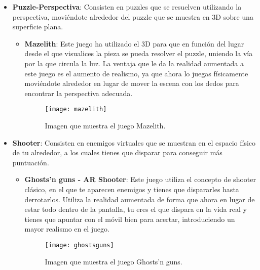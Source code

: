 \begin{itemize}
  \item \textbf{Puzzle-Perspectiva}: Consisten en puzzles que se resuelven utilizando la perspectiva, moviéndote alrededor del puzzle que se muestra en 3D sobre una superficie plana.
  \begin{itemize}
    \item \textbf{Mazelith}: Este juego ha utilizado el 3D para que en función del lugar desde el que visualices la pieza se pueda resolver el puzzle, uniendo la vía por la que circula la luz. La ventaja que le da la realidad aumentada a este juego es el aumento de realismo, ya que ahora lo juegas físicamente moviéndote alrededor en lugar de mover la escena con los dedos para encontrar la perspectiva adecuada.

    \begin{figure}[h]
      \centering
      \texttt{[image: mazelith]}
      \caption{Imagen que muestra el juego Mazelith.\protect\footnotemark}
      \label{figura-mazelith}
    \end{figure}

  \end{itemize}

\newpage

  \item \textbf{Shooter}: Consisten en enemigos virtuales que se muestran en el espacio físico de tu alrededor, a los cuales tienes que disparar para conseguir más puntuación.

  \begin{itemize}
    \item \textbf{Ghosts’n guns - AR Shooter}: Este juego utiliza el concepto de shooter clásico, en el que te aparecen enemigos y tienes que dispararles hasta derrotarlos. Utiliza la realidad aumentada de forma que ahora en lugar de estar todo dentro de la pantalla, tu eres el que dispara en la vida real y tienes que apuntar con el móvil bien para acertar, introduciendo un mayor realismo en el juego.

    \begin{figure}[h]
      \centering
      \texttt{[image: ghostsguns]}
      \caption{Imagen que muestra el juego Ghosts'n guns.\protect\footnotemark}
      \label{figura-ghosts-guns}
    \end{figure}

  \end{itemize}


\end{itemize}
